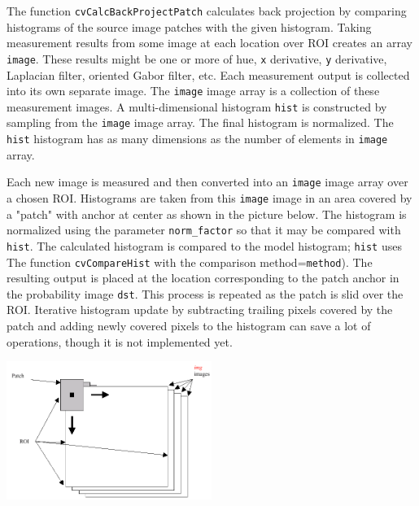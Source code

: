 \begin{description}
\end{description}

The function \texttt{cvCalcBackProjectPatch} calculates back projection by comparing histograms of the source image patches with the given histogram. Taking measurement results from some image at each location over ROI creates an array \texttt{image}. These results might be one or more of hue, \texttt{x} derivative, \texttt{y} derivative, Laplacian filter, oriented Gabor filter, etc. Each measurement output is collected into its own separate image. The \texttt{image} image array is a collection of these measurement images. A multi-dimensional histogram \texttt{hist} is constructed by sampling from the \texttt{image} image array. The final histogram is normalized. The \texttt{hist} histogram has as many dimensions as the number of elements in \texttt{image} array.

Each new image is measured and then converted into an \texttt{image} image array over a chosen ROI. Histograms are taken from this \texttt{image} image in an area covered by a "patch" with anchor at center as shown in the picture below. The histogram is normalized using the parameter \texttt{norm\_factor} so that it may be compared with \texttt{hist}. The calculated histogram is compared to the model histogram; \texttt{hist} uses The function \texttt{cvCompareHist} with the comparison method=\texttt{method}). The resulting output is placed at the location corresponding to the patch anchor in the probability image \texttt{dst}. This process is repeated as the patch is slid over the ROI. Iterative histogram update by subtracting trailing pixels covered by the patch and adding newly covered pixels to the histogram can save a lot of operations, though it is not implemented yet.

\includegraphics[width=0.5\textwidth]{pics/backprojectpatch.png}

